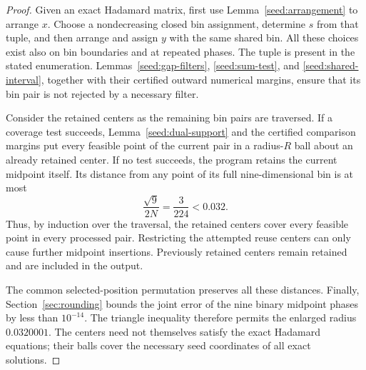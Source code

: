 \begin{proof}
Given an exact Hadamard matrix, first use
Lemma~\ref{seed:arrangement} to arrange $x$.  Choose a nondecreasing closed
bin assignment, determine $s$ from that tuple, and then arrange and assign
$y$ with the same shared bin.  All these choices exist also on bin
boundaries and at repeated phases.  The tuple is present in the stated
enumeration.  Lemmas~\ref{seed:gap-filters}, \ref{seed:sum-test}, and
\ref{seed:shared-interval}, together with their certified outward numerical
margins, ensure that its bin pair is not rejected by a necessary filter.

Consider the retained centers as the remaining bin pairs are traversed.
If a coverage test succeeds, Lemma~\ref{seed:dual-support} and the certified
comparison margins put every feasible point of the current pair in a
radius-$R$ ball about an already retained center.  If no test succeeds,
the program retains the current midpoint itself.  Its distance from any
point of its full nine-dimensional bin is at most
\[
 \frac{\sqrt9}{2N}=\frac{3}{224}<0.032.
\]
Thus, by induction over the traversal, the retained centers cover every
feasible point in every processed pair.  Restricting the attempted reuse
centers can only cause further midpoint insertions.  Previously retained
centers remain retained and are included in the output.

The common selected-position permutation preserves all these distances.
Finally, Section~\ref{sec:rounding} bounds the joint error of the nine
binary midpoint phases by less than $10^{-14}$.  The triangle inequality
therefore permits the enlarged radius $0.0320001$.  The centers need not
themselves satisfy the exact Hadamard equations; their balls cover the
necessary seed coordinates of all exact solutions.
\end{proof}
